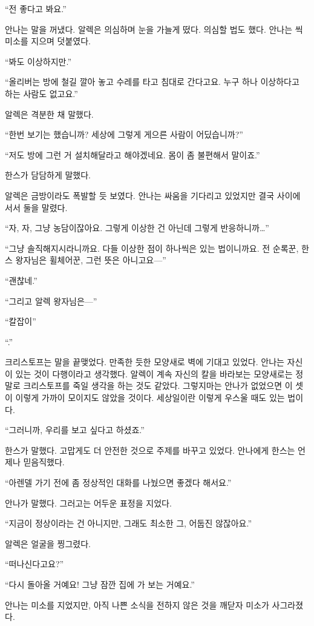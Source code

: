``전 좋다고 봐요.''

안나는 말을 꺼냈다. 알렉은 의심하며 눈을 가늘게 떴다. 의심할 법도 했다. 안나는 씩 미소를 지으며 덧붙였다.

``봐도 이상하지만.''

``올리버는 방에 철길 깔아 놓고 수레를 타고 침대로 간다고요. 누구 하나 이상하다고 하는 사람도 없고요.''

알렉은 격분한 채 말했다.

``한번 보기는 했습니까? 세상에 그렇게 게으른 사람이 어딨습니까?''

``저도 방에 그런 거 설치해달라고 해야겠네요. 몸이 좀 불편해서 말이죠.''

한스가 담담하게 말했다.

알렉은 금방이라도 폭발할 듯 보였다. 안나는 싸움을 기다리고 있었지만 결국 사이에 서서 둘을 말렸다.

``자, 자, 그냥 농담이잖아요. 그렇게 이상한 건 아닌데 그렇게 반응하니까\ldots''

``그냥 솔직해지시라니까요. 다들 이상한 점이 하나씩은 있는 법이니까요. 전 순록꾼, 한스 왕자님은 휠체어꾼, 그런 뜻은 아니고요—''

``괜찮네.''

``그리고 알렉 왕자님은—''

``칼잡이''

``.''

크리스토프는 말을 끝맺었다. 만족한 듯한 모양새로 벽에 기대고 있었다. 안나는 자신이 있는 것이 다행이라고 생각했다. 알렉이 계속 자신의 칼을 바라보는 모양새로는 정말로 크리스토프를 죽일 생각을 하는 것도 같았다. 그렇지마는 안나가 없었으면 이 셋이 이렇게 가까이 모이지도 않았을 것이다. 세상일이란 이렇게 우스울 때도 있는 법이다.

``그러니까, 우리를 보고 싶다고 하셨죠.''

한스가 말했다. 고맙게도 더 안전한 것으로 주제를 바꾸고 있었다. 안나에게 한스는 언제나 믿음직했다.

``아렌델 가기 전에 좀 정상적인 대화를 나눴으면 좋겠다 해서요.''

안나가 말했다. 그러고는 어두운 표정을 지었다.

``지금이 정상이라는 건 아니지만, 그래도 최소한 그, 어둡진 않잖아요.''

알렉은 얼굴을 찡그렸다.

``떠나신다고요?''

``다시 돌아올 거예요! 그냥 잠깐 집에 가 보는 거예요.''

안나는 미소를 지었지만, 아직 나쁜 소식을 전하지 않은 것을 깨닫자 미소가 사그라졌다.

